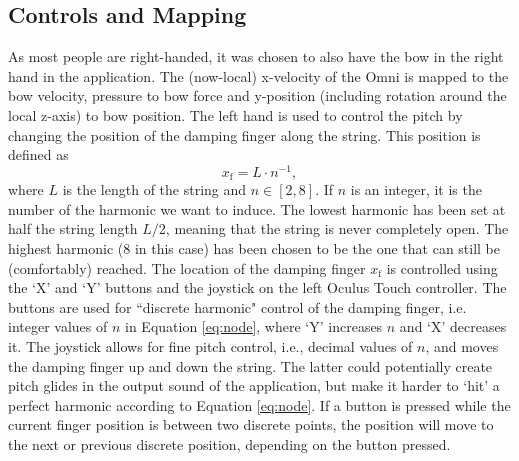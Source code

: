 \documentclass[dvipsnames, pdftex]{article}
\begin{document}
%
\subsection{Controls and Mapping}\label{sec:controls}
As most people are right-handed, it was chosen to also have the bow in the right hand in the application. The (now-local) x-velocity of the Omni is mapped to the bow velocity, pressure to bow force and y-position (including rotation around the local z-axis) to bow position. The left hand is used to control the pitch by changing the position of the damping finger along the string. This position is defined as
\begin{equation}\label{eq:node}
    x_\text{f} = L\cdot n^{-1},
\end{equation}
%
where $L$ is the length of the string and $n \in [2,8]$. If $n$ is an integer, it is the number of the harmonic we want to induce. The lowest harmonic has been set at half the string length $L/2$, meaning that the string is never completely open. The highest harmonic (8 in this case) has been chosen to be the one that can still be (comfortably) reached. The location of the damping finger $x_\text{f}$ is controlled using the `X' and `Y' buttons and the joystick on the left Oculus Touch controller. %
The buttons are used for ``discrete harmonic" control of the damping finger, i.e. integer values of $n$ in Equation \eqref{eq:node}, where `Y' increases $n$ and `X' decreases it. The joystick allows for fine pitch control, i.e., decimal values of $n$, and moves the damping finger up and down the string. The latter could potentially create pitch glides in the output sound of the application, but make it harder to `hit' a perfect harmonic according to Equation \eqref{eq:node}. If a button is pressed while the current finger position is between two discrete points, the position will move to the next or previous discrete position, depending on the button pressed.
\end{document}
